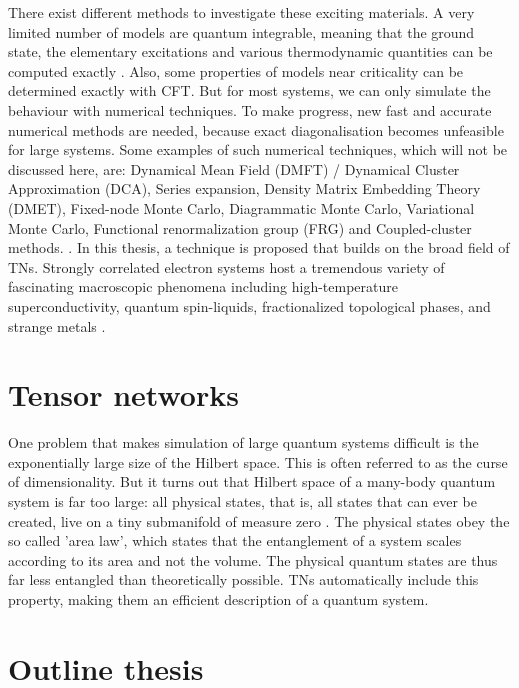 There exist different methods to investigate these exciting materials. A very limited number of models are quantum integrable, meaning that the ground state, the elementary excitations and various thermodynamic quantities can be computed exactly \cite{Lamers}. Also, some properties of models near criticality can be determined exactly with \Gls{CFT}. But for most systems, we can only simulate the behaviour with numerical techniques. To make progress, new fast and accurate numerical methods are needed, because exact diagonalisation becomes unfeasible for large systems. Some examples of such numerical techniques, which will not be discussed here, are: Dynamical Mean Field (DMFT) / Dynamical Cluster Approximation  (DCA), Series expansion, Density Matrix Embedding Theory (DMET), Fixed-node Monte Carlo, Diagrammatic Monte Carlo, Variational Monte Carlo, Functional renormalization group (FRG) and Coupled-cluster methods. \cite{Corboz}. In this thesis, a technique is proposed that builds on the broad field of \Glspl{TN}.
Strongly correlated electron systems host a tremendous variety of fascinating macroscopic phenomena including high-temperature superconductivity, quantum spin-liquids, fractionalized topological phases, and strange metals \cite{Alexandradinata2020}.

\section{Tensor networks}

One problem that makes simulation of large quantum systems difficult is the exponentially large size of the Hilbert space.  This is often referred to as the curse of dimensionality. But it turns out that Hilbert space of a many-body quantum system is far too large: all physical states, that is, all states that can ever be created, live on a tiny submanifold of measure zero \cite{Cirac}. The physical states obey the so called 'area law', which states that the entanglement of a system scales according to its area and not the volume. The physical quantum states are thus far less entangled than theoretically possible.  \Glspl{TN} automatically include this property, making them an efficient description of a quantum system.


\section{Outline thesis}


